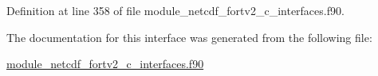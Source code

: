 Definition at line 358 of file module\+\_\+netcdf\+\_\+fortv2\+\_\+c\+\_\+interfaces.\+f90.



The documentation for this interface was generated from the following file\+:\begin{DoxyCompactItemize}
\item 
\hyperlink{module__netcdf__fortv2__c__interfaces_8f90}{module\+\_\+netcdf\+\_\+fortv2\+\_\+c\+\_\+interfaces.\+f90}\end{DoxyCompactItemize}
